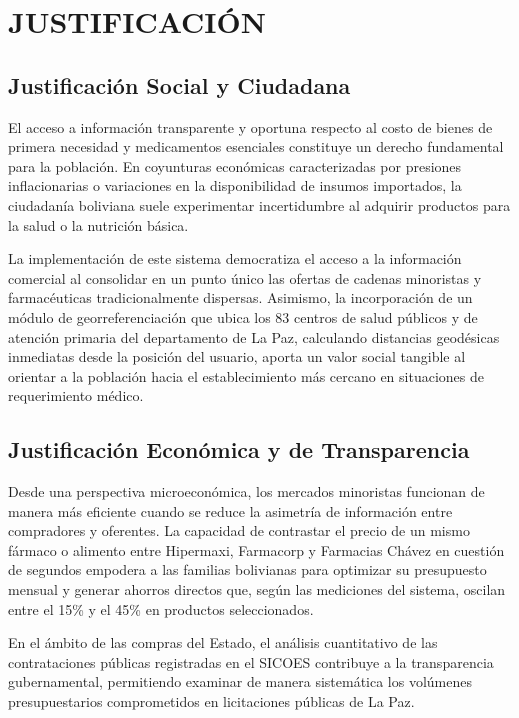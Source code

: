 \section{JUSTIFICACIÓN}

\subsection{Justificación Social y Ciudadana}
El acceso a información transparente y oportuna respecto al costo de bienes de primera necesidad y medicamentos esenciales constituye un derecho fundamental para la población. En coyunturas económicas caracterizadas por presiones inflacionarias o variaciones en la disponibilidad de insumos importados, la ciudadanía boliviana suele experimentar incertidumbre al adquirir productos para la salud o la nutrición básica. 

La implementación de este sistema democratiza el acceso a la información comercial al consolidar en un punto único las ofertas de cadenas minoristas y farmacéuticas tradicionalmente dispersas. Asimismo, la incorporación de un módulo de georreferenciación que ubica los 83 centros de salud públicos y de atención primaria del departamento de La Paz, calculando distancias geodésicas inmediatas desde la posición del usuario, aporta un valor social tangible al orientar a la población hacia el establecimiento más cercano en situaciones de requerimiento médico.

\subsection{Justificación Económica y de Transparencia}
Desde una perspectiva microeconómica, los mercados minoristas funcionan de manera más eficiente cuando se reduce la asimetría de información entre compradores y oferentes. La capacidad de contrastar el precio de un mismo fármaco o alimento entre Hipermaxi, Farmacorp y Farmacias Chávez en cuestión de segundos empodera a las familias bolivianas para optimizar su presupuesto mensual y generar ahorros directos que, según las mediciones del sistema, oscilan entre el 15\% y el 45\% en productos seleccionados. 

En el ámbito de las compras del Estado, el análisis cuantitativo de las contrataciones públicas registradas en el SICOES contribuye a la transparencia gubernamental, permitiendo examinar de manera sistemática los volúmenes presupuestarios comprometidos en licitaciones públicas de La Paz.

